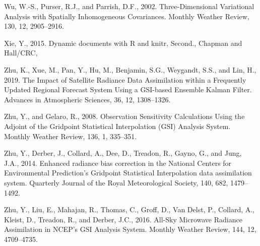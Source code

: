 \documentclass[12pt,oneside,a4paper]{reedthesis}
\begin{document}
\leavevmode\hypertarget{ref-wu2002}{}%
Wu, W.-S., Purser, R.J., and Parrish, D.F., 2002. Three-Dimensional Variational Analysis with Spatially Inhomogeneous Covariances. Monthly Weather Review, 130, 12, 2905--2916.

\leavevmode\hypertarget{ref-xie2015}{}%
Xie, Y., 2015. Dynamic documents with R and knitr, Second., Chapman and Hall/CRC,

\leavevmode\hypertarget{ref-zhu2019}{}%
Zhu, K., Xue, M., Pan, Y., Hu, M., Benjamin, S.G., Weygandt, S.S., and Lin, H., 2019. The Impact of Satellite Radiance Data Assimilation within a Frequently Updated Regional Forecast System Using a GSI-based Ensemble Kalman Filter. Advances in Atmospheric Sciences, 36, 12, 1308--1326.

\leavevmode\hypertarget{ref-zhu2008}{}%
Zhu, Y., and Gelaro, R., 2008. Observation Sensitivity Calculations Using the Adjoint of the Gridpoint Statistical Interpolation (GSI) Analysis System. Monthly Weather Review, 136, 1, 335--351.

\leavevmode\hypertarget{ref-zhu2014}{}%
Zhu, Y., Derber, J., Collard, A., Dee, D., Treadon, R., Gayno, G., and Jung, J.A., 2014. Enhanced radiance bias correction in the National Centers for Environmental Prediction's Gridpoint Statistical Interpolation data assimilation system. Quarterly Journal of the Royal Meteorological Society, 140, 682, 1479--1492.

\leavevmode\hypertarget{ref-zhu2016}{}%
Zhu, Y., Liu, E., Mahajan, R., Thomas, C., Groff, D., Van Delst, P., Collard, A., Kleist, D., Treadon, R., and Derber, J.C., 2016. All-Sky Microwave Radiance Assimilation in NCEP's GSI Analysis System. Monthly Weather Review, 144, 12, 4709--4735.


\end{document}
